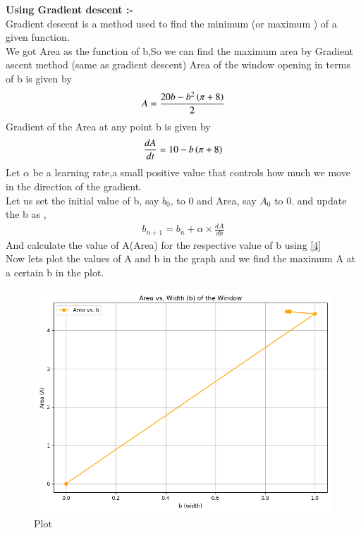 \documentclass[journal]{IEEEtran}
\begin{document}
\textbf{Using Gradient descent :-} \\
Gradient descent is a method used to find the minimum (or maximum ) of a given function. \\
We got Area as the function of b,So we can find the maximum area by Gradient ascent method (same as gradient descent) 
Area of the window opening in terms of b is given by 
\begin{align}
A = \frac{20b - b^2 \left(\pi +8\right)}{2} 
\end{align} 
Gradient of the Area at any point b is given by 
\begin{align}
\frac{dA}{dt} = 10 - b \left(\pi +8\right)
\end{align}
Let $\alpha$ be a learning rate,a small positive value that controls how much we move in the direction of the gradient. \\
Let us set the initial value of b, say $b_0$, to 0 and Area, say $A_0$ to 0. and update the b as ,
\begin{align}
b_{n+1} = b_n +\alpha \times \frac{dA}{db}
\end{align}
And calculate the value of A(Area) for the respective value of b using \eqref{4} \\
Now lets plot the values of A and b in the graph and we find the maximum A at a certain b in the plot.



\begin{figure}[htbp] %
    \centering
    \includegraphics[width=\textwidth]{figs/plot.png} %
    \caption{Plot}
\end{figure}
\end{document}
